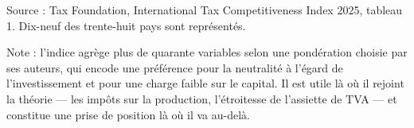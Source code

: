 Source : Tax Foundation, International Tax Competitiveness Index 2025, tableau 1. Dix-neuf des trente-huit pays sont représentés.\par Note : l'indice agrège plus de quarante variables selon une pondération choisie par ses auteurs, qui encode une préférence pour la neutralité à l'égard de l'investissement et pour une charge faible sur le capital. Il est utile là où il rejoint la théorie — les impôts sur la production, l'étroitesse de l'assiette de TVA — et constitue une prise de position là où il va au-delà.
